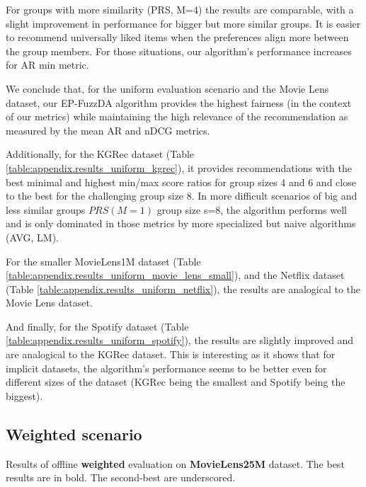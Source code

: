 For groups with more similarity (PRS, M=4) the results are comparable, with a slight improvement in performance for bigger but more similar groups. It is easier to recommend universally liked items when the preferences align more between the group members. For those situations, our algorithm's performance increases for AR min metric.

We conclude that, for the uniform evaluation scenario and the Movie Lens dataset, our EP-FuzzDA algorithm provides the highest fairness (in the context of our metrics) while maintaining the high relevance of the recommendation as measured by the mean AR and nDCG metrics.

Additionally, for the KGRec dataset (Table \ref{table:appendix.results_uniform_kgrec}), it provides recommendations with the best minimal and highest min/max score ratios for group sizes 4 and 6 and close to the best for the challenging group size 8. In more difficult scenarios of big and less similar groups $PRS(M=1)$ group size s=8, the algorithm performs well and is only dominated in those metrics by more specialized but naive algorithms (AVG, LM).

For the smaller MovieLens1M dataset (Table \ref{table:appendix.results_uniform_movie_lens_small}), and the Netflix dataset (Table \ref{table:appendix.results_uniform_netflix}), the results are analogical to the Movie Lens dataset.

And finally, for the Spotify dataset (Table \ref{table:appendix.results_uniform_spotify}), the results are slightly improved and are analogical to the KGRec dataset. This is interesting as it shows that for implicit datasets, the algorithm's performance seems to be better even for different sizes of the dataset (KGRec being the smallest and Spotify being the biggest).



\subsection{Weighted scenario}

\begin{table}[!ht]
    \centering
    \scalebox{0.82}{\hspace*{-1.2cm}{
        
    }}\hspace*{-1.3cm}
    \caption[Results of offline weighted evaluation on Movie Lens dataset]{Results of offline \textbf{weighted} evaluation on \textbf{MovieLens25M} dataset. The best results are in bold. The second-best are underscored.}
    \label{table:7.results_weighted_ml}
\end{table}

